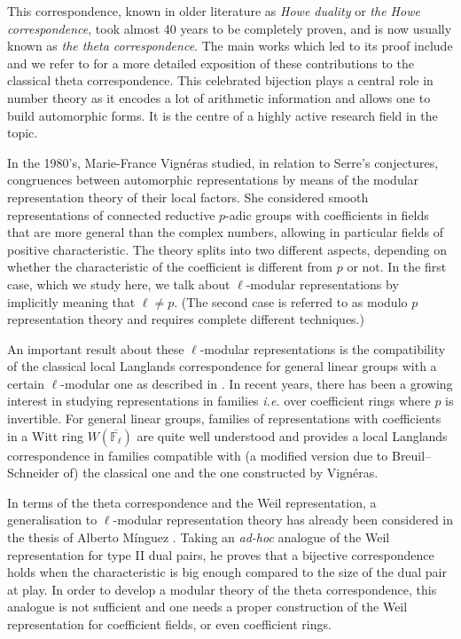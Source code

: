 \documentclass[11pt]{article}
\theoremstyle{plain}
\theoremstyle{definition}
\theoremstyle{plain}
\theoremstyle{definition}
\theoremstyle{plain}
\begin{document}
This correspondence, known in older literature as \emph{Howe duality} or \emph{the Howe correspondence}, took almost 40 years to be completely proven, and is now usually known as \emph{the theta correspondence}. The main works which led to its proof include \cite{howe,rallis,kudla_invent,mvw,wald,minguez_howe,gt,gan_sun} and we refer to \cite{trias_theta1} for a more detailed exposition of these contributions to the classical theta correspondence. This celebrated bijection plays a central role in number theory as it encodes a lot of arithmetic information and allows one to build automorphic forms. It is the centre of a highly active research field in the topic.

In the 1980's, Marie-France Vignéras studied, in relation to Serre's conjectures, congruences between automorphic representations by means of the modular representation theory of their local factors. She considered smooth representations of connected reductive $p$-adic groups with coefficients in fields that are more general than the complex numbers, allowing in particular fields of positive characteristic. The theory splits into two different aspects, depending on whether the characteristic of the coefficient is different from $p$ or not. In the first case, which we study here, we talk about $\ell$-modular representations by implicitly meaning that $\ell \neq p$. (The second case is referred to as modulo $p$ representation theory and requires complete different techniques.)

An important result about these $\ell$-modular representations is the compatibility of the classical local Langlands correspondence for general linear groups with a certain $\ell$-modular one as described in \cite{vig_corresp_Langlands_ss_mod_ell}. In recent years, there has been a growing interest in studying representations in families \textit{i.e.} over coefficient rings where $p$ is invertible. For general linear groups, families of representations with coefficients in a Witt ring $W(\overline{\mathbb{F}_\ell})$ are quite well understood \cite{helm_bernstein_center} and provides a local Langlands correspondence in families \cite{emerton_helm_families} compatible with (a modified version due to Breuil--Schneider of) the classical one and the one constructed by Vignéras.

In terms of the theta correspondence and the Weil representation, a generalisation to $\ell$-modular representation theory has already been considered in the thesis of Alberto M\'inguez \cite{minguez_thesis}. Taking an \textit{ad-hoc} analogue of the Weil representation for type II dual pairs, he proves that a bijective correspondence holds when the characteristic is big enough compared to the size of the dual pair at play. In order to develop a modular theory of the theta correspondence, this analogue is not sufficient and one needs a proper construction of the Weil representation for coefficient fields, or even coefficient rings. 
\end{document}
